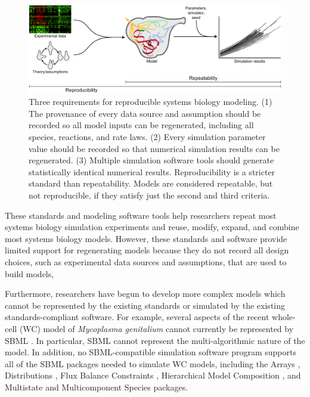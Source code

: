 \documentclass[journal,transmag,twoside]{IEEEtran}
\begin{document}
\begin{figure}[!tb]
\centering
\includegraphics[width=\textwidth]{figure1/figure1}
\caption{Three requirements for reproducible systems biology modeling. (1) The provenance of every data source and assumption should be recorded so all model inputs can be regenerated, including all species, reactions, and rate laws.
(2) Every simulation parameter value should be recorded so that numerical simulation results can be regenerated. (3) Multiple simulation software tools should generate statistically identical numerical results. Reproducibility is a stricter standard than repeatability. Models are considered repeatable, but not reproducible, if they satisfy just the second and third criteria.}
\label{fig_repro_diagram}
\end{figure}

These standards and modeling software tools help researchers repeat most systems biology simulation experiments and reuse, modify, expand, and combine most systems biology models. However, these standards and software provide limited support for regenerating models  because they do not record all design choices, such as experimental data sources and assumptions, that are used to build models,

Furthermore, researchers have begun to develop more complex models which cannot be represented by the existing standards or simulated by the existing standards-compliant software. For example, several aspects of the recent whole-cell (WC) model of \textit{Mycoplasma genitalium} \cite{Karr2012} cannot currently be represented by SBML \cite{Waltemath2016}. In particular, SBML cannot represent the multi-algorithmic nature of the model. In addition, no SBML-compatible simulation software program supports all of the SBML packages needed to simulate WC models, including the Arrays \cite{watanabe2016efficient}, Distributions \cite{Moodie2015}, Flux Balance Constraints \cite{olivier2015fbc}, Hierarchical Model Composition \cite{smith2015sbml}, and Multistate and Multicomponent Species \cite{SBMLMulti} packages.
\end{document}
